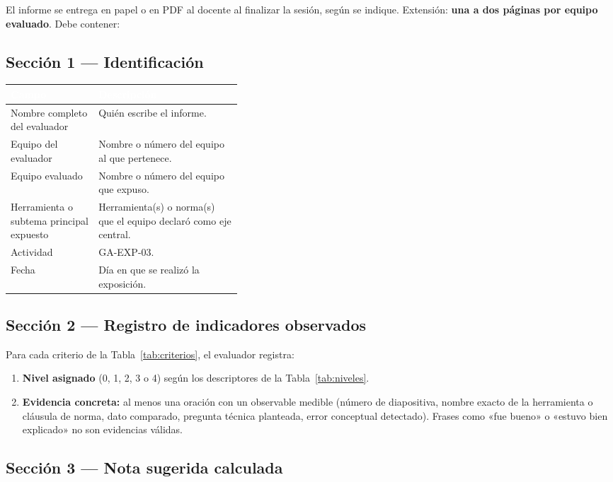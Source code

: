 \documentclass[11pt]{article}
\newcommand{\bhdr}[1]{\cellcolor{midblue}\textcolor{white}{\textbf{#1}}}
\begin{document}
El informe se entrega en papel o en PDF al docente al finalizar la sesión, según se indique. Extensión: \textbf{una a dos páginas por equipo evaluado}. Debe contener:

\subsection{\textcolor{midblue}{Sección 1 --- Identificación}}

\noindent\begin{tabularx}{\linewidth}{|L{0.38\linewidth}|Y|}
	\hline
	\bhdr{Campo} & \bhdr{Descripción}\\
	\hline
	Nombre completo del evaluador & Quién escribe el informe.\\
	\hline
	 Equipo del evaluador & Nombre o número del equipo al que pertenece.\\
	\hline
	Equipo evaluado & Nombre o número del equipo que expuso.\\
	\hline
	 Herramienta o subtema principal expuesto & Herramienta(s) o norma(s) que el equipo declaró como eje central.\\
	\hline
	Actividad & GA-EXP-03.\\
	\hline
	 Fecha & Día en que se realizó la exposición.\\
	\hline
\end{tabularx}

\subsection{\textcolor{midblue}{Sección 2 --- Registro de indicadores observados}}

Para cada criterio de la Tabla~\ref{tab:criterios}, el evaluador registra:
\begin{enumerate}[leftmargin=18pt,itemsep=3pt]
	\item \textbf{Nivel asignado} (0, 1, 2, 3 o 4) según los descriptores de la Tabla~\ref{tab:niveles}.
	\item \textbf{Evidencia concreta:} al menos una oración con un observable medible (número de diapositiva, nombre exacto de la herramienta o cláusula de norma, dato comparado, pregunta técnica planteada, error conceptual detectado). Frases como «fue bueno» o «estuvo bien explicado» no son evidencias válidas.
\end{enumerate}

\subsection{\textcolor{midblue}{Sección 3 --- Nota sugerida calculada}}
\end{document}
